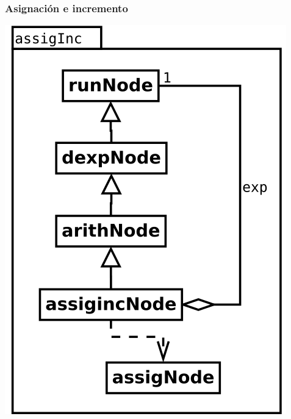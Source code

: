 \subsubsection {Asignación e incremento}
\begin{center}
\includegraphics[scale=0.4]{assigInc.png} \\
\end{center}


